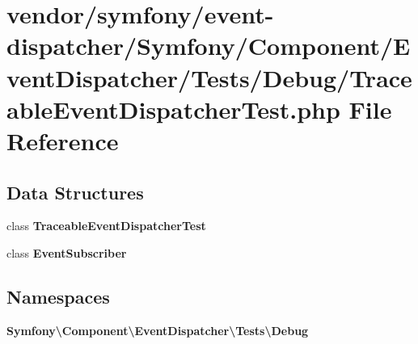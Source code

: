 \section{vendor/symfony/event-\/dispatcher/\+Symfony/\+Component/\+Event\+Dispatcher/\+Tests/\+Debug/\+Traceable\+Event\+Dispatcher\+Test.php File Reference}
\label{event-dispatcher_2_symfony_2_component_2_event_dispatcher_2_tests_2_debug_2_traceable_event_dispatcher_test_8php}
\subsection*{Data Structures}
\begin{DoxyCompactItemize}
\item 
class {\bf Traceable\+Event\+Dispatcher\+Test}
\item 
class {\bf Event\+Subscriber}
\end{DoxyCompactItemize}
\subsection*{Namespaces}
\begin{DoxyCompactItemize}
\item 
 {\bf Symfony\textbackslash{}\+Component\textbackslash{}\+Event\+Dispatcher\textbackslash{}\+Tests\textbackslash{}\+Debug}
\end{DoxyCompactItemize}

